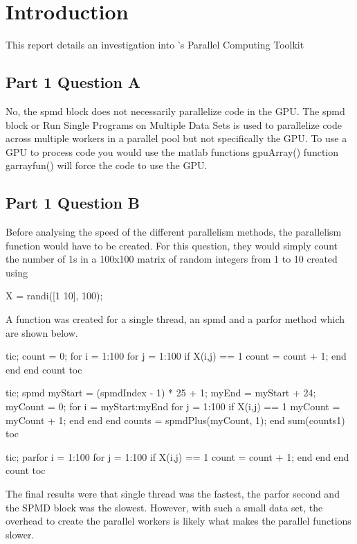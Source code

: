 \section{Introduction}
This report details an investigation into \MATLAB's Parallel Computing Toolkit 

\subsection{Part 1 Question A}
No, the spmd block does not necessarily parallelize code in the GPU.
The spmd block or Run Single Programs on Multiple Data Sets is used to parallelize code across multiple workers in a parallel pool but not specifically the GPU. To use a GPU to process code you would use the matlab functions gpuArray() function garrayfun() will force the code to use the GPU.

\subsection{Part 1 Question B}
Before analysing the speed of the different parallelism methods, the parallelism function would have to be created.
For this question, they would simply count the number of 1s in a 100x100 matrix of random integers from 1 to 10 created using

\begin{Matlab}
    X = randi([1 10], 100);
\end{Matlab}

A function was created for a single thread, an spmd and a parfor method which are shown below.

\begin{Matlab}
    tic;
    count = 0;
    for i = 1:100
        for j = 1:100
            if X(i,j) == 1
                count = count + 1;
            end
        end
    end
    count
    toc
\end{Matlab}

\begin{Matlab}
    tic;
    spmd
        myStart = (spmdIndex - 1) * 25 + 1;
        myEnd = myStart + 24;
        myCount = 0;
        for i = myStart:myEnd
            for j = 1:100
                if X(i,j) == 1
                    myCount = myCount + 1;
                end
            end
        end
        counts = spmdPlus(myCount, 1);
    end
    sum(counts{1})
    toc
\end{Matlab}

\begin{Matlab}
    tic;
    parfor i = 1:100
        for j = 1:100
            if X(i,j) == 1
                count = count + 1;
            end
        end
    end
    count
    toc
\end{Matlab}

The final results were that single thread was the fastest, the parfor second and the SPMD block was the slowest.
However, with such a small data set, the overhead to create the parallel workers is likely what makes the parallel functions slower.